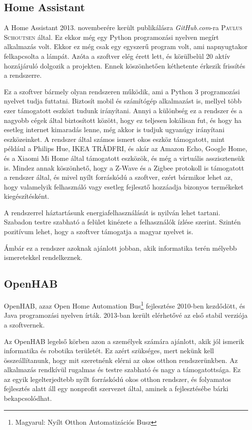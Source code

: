 \documentclass[
]{thesis-ekf}
\theoremstyle{definition}
\theoremstyle{remark}
\begin{document}
	\subsection{Home Assistant}
	A Home Assistant 2013. novemberére került publikálásra \emph{GitHub.com}-ra \textsc{Paulus Schoutsen} által. Ez ekkor még egy Python programozási nyelven megírt alkalmazás volt.
	Ekkor ez még csak egy egyszerű program volt, ami napnyugtakor felkapcsolta a lámpát. Azóta a szoftver elég érett lett, és körülbelül 20 aktív hozzájáruló dolgozik a projekten. Ennek köszönhetően kéthetente érkezik frissítés a rendszerre.\cite{creation-of-home-assistant}
	
	Ez a szoftver bármely olyan rendszeren működik, ami a Python 3 programozási nyelvet tudja futtatni. Biztosít mobil és számítógép alkalmazást is, mellyel több ezer támogatott eszközt tudunk irányítani. Annyi a különbség ez a rendszer és a nagyobb cégek által biztosított között, hogy ez teljesen lokálisan fut, és hogy ha esetleg internet kimaradás lenne, még akkor is tudjuk ugyanúgy irányítani eszközeinket. A rendszer által számos ismert okos eszköz támogatott, mint például a Philips Hue, IKEA TRÅDFRI, és akár az Amazon Echo, Google Home, és a Xiaomi Mi Home által támogatott eszközök, és még a virtuális asszisztensük is.\cite{home-assistance-itegrations} Mindez annak köszönhető, hogy a Z-Wave és a Zigbee protokoll is támogatott a rendszer által, és mivel nyílt forráskódú a szoftver, ezért bármikor lehet az, hogy valamelyik felhasználó vagy esetleg fejlesztő hozzáadja bizonyos termékeket kiegészítésként. 

	A rendszerrel háztartásunk energiafelhasználását is nyilván lehet tartani. Szabadon testre szabható a felület kinézete a felhasználók ízlése szerint. Szintén pozitívum lehet, hogy a szoftver támogatja a magyar nyelvet is.
	
	Ámbár ez a rendszer azoknak ajánlott jobban, akik informatika terén mélyebb ismeretekkel rendelkeznek.
	
	\subsection{OpenHAB}
	
	OpenHAB, azaz Open Home Automation Bus\footnote{Magyarul: Nyílt Otthon Automatizációs Busz} fejlesztése 2010-ben kezdődött, és Java programozási nyelven írták. 2013-ban került elérhetővé az első stabil verziója a szoftvernek. 
	
	Az OpenHAB legelső körben azon a személyek számára ajánlott, akik jól ismerik informatika és robotika területét. Ez azért szükséges, mert nekünk kell összeállítanunk, hogy mit szeretnénk elérni az okos otthon rendszerünkben. Az alkalmazás rendkívül rugalmas és testre szabható és nagy a támogatottsága. Ez az egyik legelterjedtebb nyílt forráskódú okos otthon rendszer, és folyamatos fejlesztés alatt áll egy nonprofit szervezet által, aminek a fejlesztésébe bárki bekapcsolódhat.
	
\end{document}
